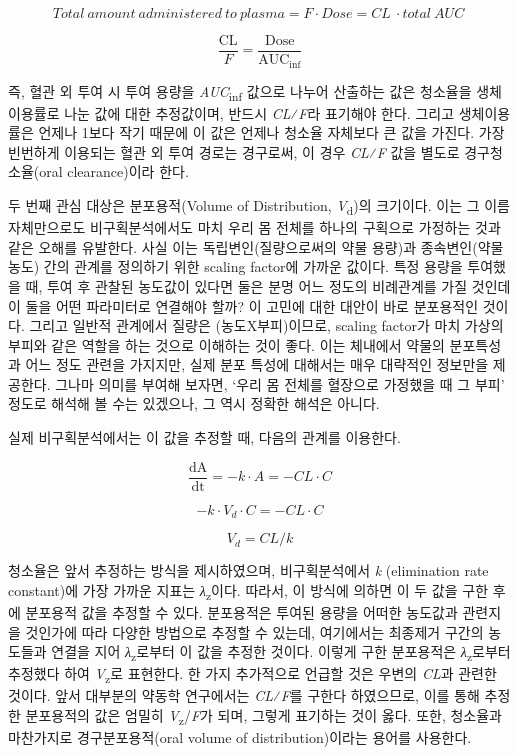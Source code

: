 \documentclass[
  11pt,
  krantz2, a4paper, twoside]{krantz}
\begin{document}
\[Total\ amount\ administered\ to\ plasma = F \cdot Dose = CL\  \cdot total\ AUC\ \]

\[\frac{\text{CL}}{F} = \frac{\text{Dose}}{\text{AUC}_{\inf}}\]

즉, 혈관 외 투여 시 투여 용량을 \emph{AUC}\textsubscript{inf} 값으로 나누어 산출하는 값은 청소율을 생체이용률로 나눈 값에 대한 추정값이며, 반드시 \emph{CL}⁄\emph{F}라 표기해야 한다. 그리고 생체이용률은 언제나 1보다 작기 때문에 이 값은 언제나 청소율 자체보다 큰 값을 가진다. 가장 빈번하게 이용되는 혈관 외 투여 경로는 경구로써, 이 경우 \emph{CL}⁄\emph{F} 값을 별도로 경구청소율(oral clearance)이라 한다.

두 번째 관심 대상은 분포용적(Volume of Distribution, \emph{V}\textsubscript{d})의 크기이다. 이는 그 이름 자체만으로도 비구획분석에서도 마치 우리 몸 전체를 하나의 구획으로 가정하는 것과 같은 오해를 유발한다. 사실 이는 독립변인(질량으로써의 약물 용량)과 종속변인(약물 농도) 간의 관계를 정의하기 위한 scaling factor에 가까운 값이다. 특정 용량을 투여했을 때, 투여 후 관찰된 농도값이 있다면 둘은 분명 어느 정도의 비례관계를 가질 것인데 이 둘을 어떤 파라미터로 연결해야 할까? 이 고민에 대한 대안이 바로 분포용적인 것이다. 그리고 일반적 관계에서 질량은 (농도X부피)이므로, scaling factor가 마치 가상의 부피와 같은 역할을 하는 것으로 이해하는 것이 좋다. 이는 체내에서 약물의 분포특성과 어느 정도 관련을 가지지만, 실제 분포 특성에 대해서는 매우 대략적인 정보만을 제공한다. 그나마 의미를 부여해 보자면, `우리 몸 전체를 혈장으로 가정했을 때 그 부피' 정도로 해석해 볼 수는 있겠으나, 그 역시 정확한 해석은 아니다.

실제 비구획분석에서는 이 값을 추정할 때, 다음의 관계를 이용한다.

\[\frac{\text{dA}}{\text{dt}} = - k \cdot A = - CL \cdot C\]

\[- k \cdot V_{d} \cdot C = - CL \cdot C\]

\[V_{d} = CL/k\]

청소율은 앞서 추정하는 방식을 제시하였으며, 비구획분석에서 \emph{k} (elimination rate constant)에 가장 가까운 지표는 \emph{λ}\textsubscript{z}이다. 따라서, 이 방식에 의하면 이 두 값을 구한 후에 분포용적 값을 추정할 수 있다. 분포용적은 투여된 용량을 어떠한 농도값과 관련지을 것인가에 따라 다양한 방법으로 추정할 수 있는데, 여기에서는 최종제거 구간의 농도들과 연결을 지어 \emph{λ}\textsubscript{z}로부터 이 값을 추정한 것이다. 이렇게 구한 분포용적은 \emph{λ}\textsubscript{z}로부터 추정했다 하여 \emph{V}\textsubscript{z}로 표현한다. 한 가지 추가적으로 언급할 것은 우변의 \emph{CL}과 관련한 것이다. 앞서 대부분의 약동학 연구에서는 \emph{CL}⁄\emph{F}를 구한다 하였으므로, 이를 통해 추정한 분포용적의 값은 엄밀히 \emph{V}\textsubscript{z}/\emph{F}가 되며, 그렇게 표기하는 것이 옳다. 또한, 청소율과 마찬가지로 경구분포용적(oral volume of distribution)이라는 용어를 사용한다.
\end{document}
